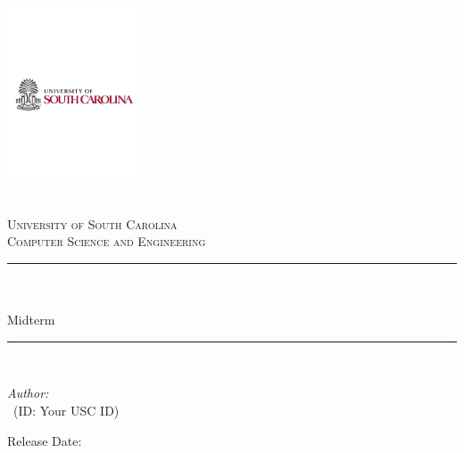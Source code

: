 \begin{titlepage}

\newcommand{\HRule}{\rule{\linewidth}{0.5mm}} %



\includegraphics[width = 4cm]{./figures/usc}\\[0.5cm] 

\begin{center} %

\textsc{\LARGE \reporttype}\\[1.5cm] 
\textsc{\Large University of South Carolina}\\[0.5cm] 
\textsc{\large Computer Science and Engineering}\\[0.5cm] 

\HRule \\[0.4cm]
{ \huge \bfseries \reporttitle}\\ %
{\Large Midterm}
\HRule \\[1.5cm]
\end{center}

\begin{flushleft} \large
\textit{Author:}\\
\reportauthor~(ID: Your USC ID) %
\end{flushleft}
\vspace{2cm}
\makeatletter
Release Date: \@date 


\end{titlepage}

